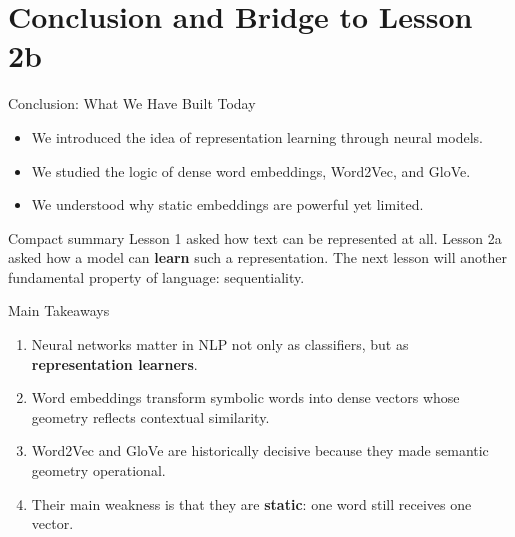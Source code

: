 \documentclass[11pt,aspectratio=169,professionalfonts]{beamer}
\begin{document}
\section{Conclusion and Bridge to Lesson 2b}
%
\begin{frame}{Conclusion: What We Have Built Today}
\begin{itemize}
    \item We introduced the idea of representation learning through neural models.
    \item We studied the logic of dense word embeddings, Word2Vec, and GloVe.
    \item We understood why static embeddings are powerful yet limited.
\end{itemize}

\vspace{0.2cm}
\begin{block}{Compact summary}
Lesson 1 asked how text can be represented at all. Lesson 2a asked how a model can \textbf{learn} such a representation. The next lesson will another fundamental property of language: sequentiality.
\end{block}
\end{frame}
%
%
\begin{frame}{Main Takeaways}
\begin{enumerate}
    \item Neural networks matter in NLP not only as classifiers, but as \textbf{representation learners}.
    \item Word embeddings transform symbolic words into dense vectors whose geometry reflects contextual similarity.
    \item Word2Vec and GloVe are historically decisive because they made semantic geometry operational.
    \item Their main weakness is that they are \textbf{static}: one word still receives one vector.
\end{enumerate}
\end{frame}
%
%
\end{document}
